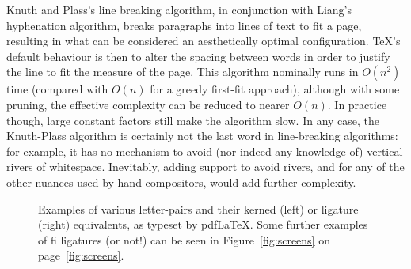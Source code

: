 Knuth and Plass's line breaking algorithm, in conjunction with Liang's hyphenation algorithm, breaks paragraphs into lines of text to fit a page, resulting in what can be considered an aesthetically optimal configuration. \TeX 's default behaviour is then to alter the spacing between words in order to justify the line to fit the measure of the page. This algorithm nominally runs in $O(n^2)$ time (compared with $O(n)$ for a greedy first-fit approach), although with some pruning, the effective complexity can be reduced to nearer $O(n)$.\cite{Hirschberg1987,Eppstein1992,Hurst2009} In practice though, large constant factors still make the algorithm slow. In any case, the Knuth-Plass algorithm is certainly not the last word in line-breaking algorithms: for example, it has no mechanism to avoid (nor indeed any knowledge of) vertical rivers of whitespace.\cite{Mittelbach1992} Inevitably, adding support to avoid rivers, and for any of the other nuances used by hand compositors, would add further complexity.



\begin{figure}
 \caption[Examples of microtypographical techniques]{Examples of various letter-pairs and their kerned (left) or ligature (right) equivalents, as typeset by pdf\LaTeX{}. Some further examples of fi ligatures (or not!) can be seen in Figure~\ref{fig:screens} on page~\ref{fig:screens}.}
 \label{fig:kern-lig}
\end{figure}


